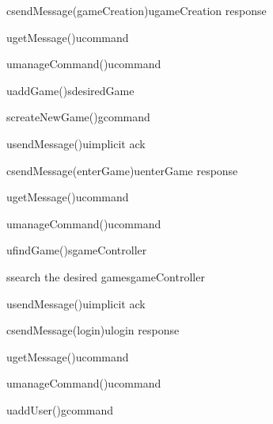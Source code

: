 \documentclass[a4paper]{article}
\begin{document}
	\begin{center}
		\begin{sequencediagram}

			\begin{call}{c}{sendMessage(gameCreation)}{u}{gameCreation response}
				\begin{call}{u}{getMessage()}{u}{command}
				\end{call}
				\begin{call}{u}{manageCommand()}{u}{command}
				\end{call}
				\begin{call}{u}{addGame()}{s}{desiredGame}
					\begin{call}{s}{createNewGame()}{g}{command}
					\end{call}
				\end{call}
				\begin{call}{u}{sendMessage()}{u}{implicit ack}
				\end{call}
			\end{call}
			\begin{call}{c}{sendMessage(enterGame)}{u}{enterGame response}
				\begin{call}{u}{getMessage()}{u}{command}
				\end{call}
				\begin{call}{u}{manageCommand()}{u}{command}
				\end{call}
				\begin{call}{u}{findGame()}{s}{gameController}
					\begin{call}{s}{search the desired game}{s}{gameController}
					\end{call}
				\end{call}
				\begin{call}{u}{sendMessage()}{u}{implicit ack}
				\end{call}
			\end{call}
			\begin{call}{c}{sendMessage(login)}{u}{login response}
				\begin{call}{u}{getMessage()}{u}{command}
				\end{call}
				\begin{call}{u}{manageCommand()}{u}{command}
				\end{call}
				\begin{call}{u}{addUser()}{g}{command}
				\end{call}
			\end{call}
		\end{sequencediagram}
	\end{center}
\end{document}
